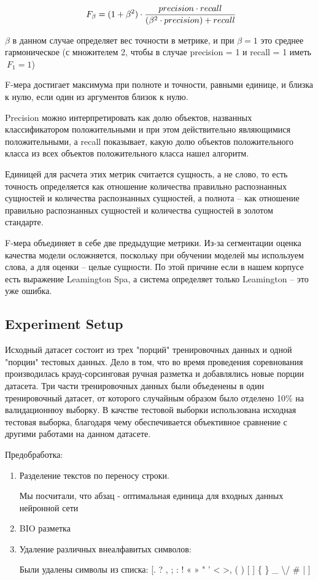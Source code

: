 \documentclass{article}
\begin{document}
$$\large \ F_\beta = (1 + \beta^2) \cdot \frac{precision \cdot recall}{(\beta^2 \cdot precision) + recall}$$


$\beta$ в данном случае определяет вес точности в метрике, и при $\beta = 1$ это среднее гармоническое (с множителем 2, чтобы в случае precision = 1 и recall = 1 иметь $\ F_1 = 1$)

F-мера достигает максимума при полноте и точности, равными единице, и близка к нулю, если один из аргументов близок к нулю.

Precision можно интерпретировать как долю объектов, названных классификатором положительными и при этом действительно являющимися положительными, а recall показывает, какую долю объектов положительного класса из всех объектов положительного класса нашел алгоритм.

Единицей для расчета этих метрик считается сущность, а не слово, то есть точность определяется как отношение количества правильно распознанных сущностей и количества распознанных сущностей, а полнота – как отношение правильно распознанных сущностей и количества сущностей в золотом стандарте. 

F-мера объединяет в себе две предыдущие метрики.
Из-за сегментации оценка качества модели осложняется, поскольку при обучении моделей мы используем слова, а для оценки – целые сущности. По этой причине если в нашем корпусе есть выражение Leamington Spa, а система определяет только Leamington – это уже ошибка.


\subsection{Experiment Setup}

Исходный датасет состоит из трех "порций" тренировочных данных и одной "порции" тестовых данных. Дело в том, что во время проведения соревнования производилась крауд-сорсинговая ручная разметка и добавлялись новые порции датасета. Три части тренировочных данных были объеденены в один тренировочный датасет, от которого случайным образом было отделено 10\% на валидационнюу выборку. В качстве тестовой выборки использована исходная тестовая выборка, благодаря чему обеспечивается объективное сравнение с другими работами на данном датасете.
\newline

Предобработка:

\begin{enumerate}
    \item Разделение текстов по переносу строки.
        
        Мы посчитали, что абзац - оптимальная единица для входных данных нейронной сети

    \item BIO разметка
    
    \item Удаление различных внеалфавитых символов:
    
        Были удалены символы из списка: [. ? , ; : ! « » " ' < >,  ( ) [ ] \{ \} \newline
         \─ \- \_ \textbackslash / \# \№ | ] %

\end{enumerate}  \\
\end{document}
